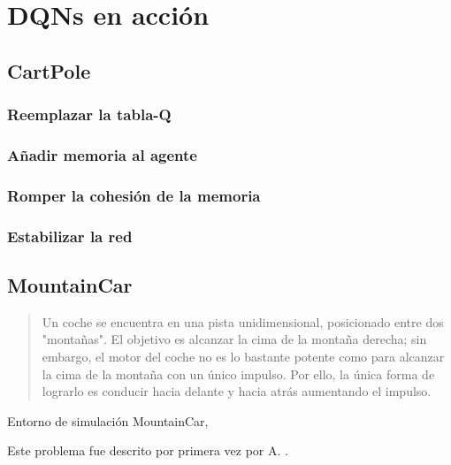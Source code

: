 \chapter{DQNs en acción}
\label{cap:dqnEnAccion}


\section{CartPole}
\label{sec:cartpoleDQN}

\subsection{Reemplazar la tabla-Q}

\subsection{Añadir memoria al agente}

\subsection{Romper la cohesión de la memoria}

\subsection{Estabilizar la red}

\section{MountainCar}

\begin{quote}
    Un coche se encuentra en una pista unidimensional, posicionado entre dos "montañas". El objetivo es alcanzar la cima de la montaña derecha; sin embargo, el motor del coche no es lo bastante potente como para alcanzar la cima de la montaña con un único impulso. Por ello, la única forma de lograrlo es conducir hacia delante y hacia atrás aumentando el impulso.
\end{quote}

%
       {Entorno de simulación MountainCar, \citet{brockman2016openai}}

Este problema fue descrito por primera vez por A. \citet{Moore90efficientmemory-based}.

